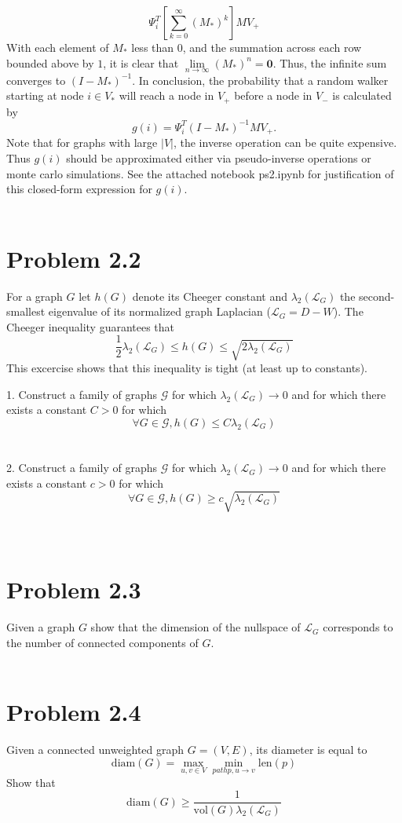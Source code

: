 \documentclass{amsart}
\begin{document}
	\[
	\Psi_i^T \left[\sum_{k=0}^{\infty}\left( M_* \right)^k\right]MV_+
	\]
	With each element of $M_*$ less than $0$, and the summation across each row bounded above by $1$, it is clear that $\lim\limits_{n \rightarrow \infty} (M_*)^n = \mathbf{0}$. Thus, the infinite sum converges to $(I-M_*)^{-1}$. In conclusion, the probability that a random walker starting at node $i \in V_*$ will reach a node in $V_+$ before a node in $V_-$ is calculated by
	\[
	g(i) = \Psi_i^T\left( I - M_* \right)^{-1}MV_+.
	\]
	Note that for graphs with large $|V|$, the inverse operation can be quite expensive. Thus $g(i)$ should be approximated either via pseudo-inverse operations or monte carlo simulations. See the attached notebook \textsf{ps2.ipynb} for justification of this closed-form expression for $g(i)$.
	\\\\
	\section{Problem 2.2}
	For a graph $G$ let $h(G)$ denote its Cheeger constant and $\lambda_2(\mathcal{L}_G)$ the second-smallest eigenvalue of its normalized graph Laplacian ($\mathcal{L}_G = D - W$). The Cheeger inequality guarantees that 
	\[
	\frac{1}{2}\lambda_2(\mathcal{L}_G) \le h(G) \le \sqrt{2\lambda_2(\mathcal{L}_G)}
	\]
	This excercise shows that this inequality is tight (at least up to constants).
	
	1. Construct a family of graphs $\mathcal{G}$ for which $\lambda_2(\mathcal{L}_G) \rightarrow 0$ and for which there exists a constant $C>0$ for which 
	\[
	\forall G \in \mathcal{G}, h(G) \le C\lambda_2(\mathcal{L}_G)
	\]
	\\\\
	
	2. Construct a family of graphs $\mathcal{G}$ for which $\lambda_2(\mathcal{L}_G) \rightarrow 0$ and for which there exists a constant $c>0$ for which 
	\[
	\forall G \in \mathcal{G}, h(G) \ge c\sqrt{\lambda_2(\mathcal{L}_G)}
	\]
	\\\\
	
	\section{Problem  2.3}
	Given a graph $G$ show that the dimension of the nullspace of $\mathcal{L}_G$ corresponds to the number of connected components of $G$.
	\\\\
	
	\section{Problem 2.4}
	Given a connected unweighted graph $G = (V,E)$, its diameter is equal to 
	\[
	\text{diam}(G) = \max_{u,v\in V} \min_{path p, u\rightarrow v} \text{len}(p)
	\]
	Show that 
	\[
	\text{diam}(G) \ge \frac{1}{\text{vol}(G)\lambda_2(\mathcal{L}_G)}
	\]
	
	
\end{document}
